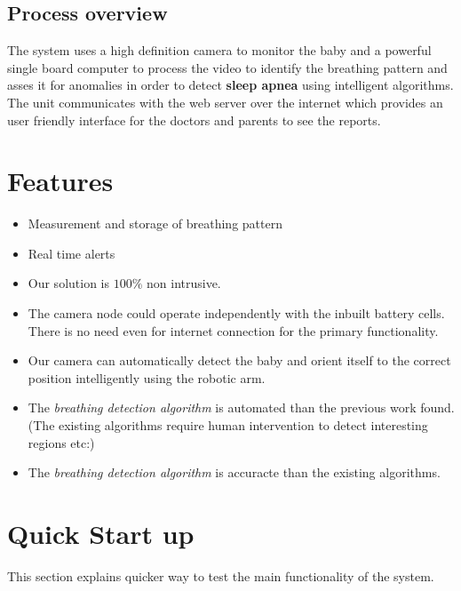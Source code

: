 \documentclass{report}
\begin{document}
\subsection{Process overview}
The system uses a high definition camera to monitor the baby and a powerful single board computer to process the video to identify the breathing pattern and asses it for anomalies in order to detect \textbf{sleep apnea} using intelligent algorithms. The unit communicates with the web server over the internet which provides an user friendly interface for the doctors and parents to see the reports. 


\section{Features}

\begin{itemize}
    \item Measurement and storage of breathing pattern
    \item Real time alerts
    \item Our solution is $100\%$ non intrusive.
    \item The camera node could operate independently with the inbuilt battery cells. There is no need even for internet connection for the primary functionality.
    \item Our camera can automatically detect the baby and orient itself to the correct position intelligently using the robotic arm.
    \item The \textit{breathing detection algorithm} is automated than the previous work found. (The existing algorithms require human intervention to detect interesting regions etc:)
    \item The \textit{breathing detection algorithm} is accuracte than the existing algorithms.


\end{itemize}

\section{Quick Start up}    %

This section explains quicker way to test the main functionality of the system.
\end{document}

